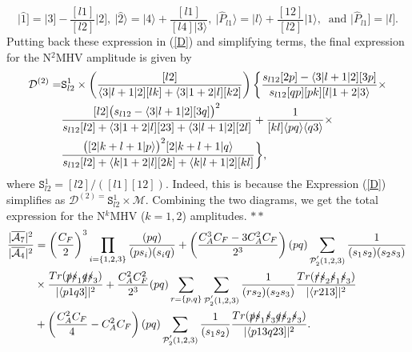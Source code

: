 \begin{equation}
\vert \hat{1}]=\vert 3]-\frac{[l1]}{[l2]} \vert 2], \: \vert \hat{2}\rangle =\vert 4\rangle +\frac{[l1]}{[l4] \vert 3\rangle}, \: \vert \hat{P}_{l1}\rangle =\vert l\rangle+\frac{[12]}{[l2]} \vert 1\rangle, \: \text{ and } \vert \hat{P}_{l1}]=\vert l].
\end{equation} 
Putting back these expression in (\ref{D}) and simplifying terms, the final expression for the N$^2$MHV amplitude is given by 
\begin{align}
\mathcal{D}^{(2)} =& \mathtt{S}^1_{l2} \times \left( \frac{[l2]}{\langle 3\vert l+1\vert 2][lk]+ \langle 3\vert 1+2\vert l][k2]} \right) \bigg\lbrace \frac{s_{l12} [2p] - \langle 3\vert l+1\vert 2] [3p]}{s_{l12} [qp] [pk]  [l\vert 1+2\vert 3\rangle} \times \nonumber \\
& \frac{[l2] \big( s_{l12} - \langle 3\vert l+1\vert 2][3q] \big)^2}{ s_{l12} [l2]+ \langle 3\vert 1+2\vert l][23]+ \langle 3\vert l+1\vert 2][2l]}+ \frac{1}{[kl] \langle pq\rangle \langle q3\rangle} \times \nonumber \\
& \frac{\big( [2\vert k+l+1\vert p\rangle \big)^2 [2\vert k+l+1\vert q\rangle}{s_{l12} [l2]+ \langle k\vert 1+2\vert l][2k]+ \langle k\vert l+1\vert 2][kl]} \bigg\rbrace ,
\end{align}
where $\mathtt{S}^1_{l2}=[l2]/([l1][12])$. Indeed, this is because the Expression (\ref{D}) simplifies as $\mathcal{D}^{(2)=}\mathtt{S}^1_{l2} \times \mathcal{M}$. Combining the two diagrams, we get the total expression for the N$^k$MHV ($k=1,2$) amplitudes. $\ast\ast$
\begin{align}
\frac{\vert \overline{\mathcal{A}_7}\vert^2}{\vert \overline{\mathcal{A}_4}\vert^2} &= \left( \frac{C_F}{2} \right)^3 \prod_{i=\{1,2,3\}} \frac{(pq)}{(ps_i) (s_iq)} + \left( \frac{C^3_AC_F-3C^2_AC_F}{2^3} \right) (p q ) \sum_{\mathcal{P}^{'}_2(1,2,3)} \frac{1}{(s_1 s_2) (s_2 s_3)} \, \nonumber \\ 
& \times \frac{Tr(\slashed{p} \slashed{s}_1 \slashed{q} \slashed{s}_3)}{\vert \langle p1q3] \vert^2}+\frac{C^2_A C^2_F}{2^3} (p q) \sum_{r=\{p,q\}} \sum_{\mathcal{P}^{'}_2(1,2,3)} \frac{1}{(r s_2) (s_2 s_3)} \frac{Tr(\slashed{r} \slashed{s}_2 \slashed{s}_1 \slashed{s}_3)}{\vert \langle r213]\vert^2} \nonumber \\
& +\left( \frac{C^2_AC_F}{4}-C^2_AC_F \right)  (p q) \sum_{\mathcal{P}^{'}_2(1,2,3)} \frac{1}{(s_1 s_2)} \frac{Tr(\slashed{p} \slashed{s}_1 \slashed{s}_3 \slashed{q} \slashed{s}_2 \slashed{s}_3)}{\vert \langle p13q23]\vert^2}.
\end{align}